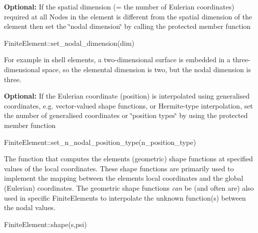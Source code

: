 \begin{DoxyItemize}
\begin{DoxyItemize}
\item {\bfseries Optional\+:} If the spatial dimension (= the number of Eulerian coordinates) required at all Nodes in the element is different from the spatial dimension of the element then set the \char`\"{}nodal dimension\char`\"{} by calling the protected member function
\begin{DoxyCode}
FiniteElement::set\_nodal\_dimension(dim)
\end{DoxyCode}
 For example in shell elements, a two-\/dimensional surface is embedded in a three-\/dimensional space, so the elemental dimension is two, but the nodal dimension is three.
\item {\bfseries Optional\+:} If the Eulerian coordinate (position) is interpolated using generalised coordinates, e.\+g. vector-\/valued shape functions, or Hermite-\/type interpolation, set the number of generalised coordinates or \char`\"{}position types\char`\"{} by using the protected member function 
\begin{DoxyCode}
FiniteElement::set\_n\_nodal\_position\_type(n\_position\_type)
\end{DoxyCode}

\end{DoxyItemize}
\item The function that computes the element\textquotesingle{}s (geometric) shape functions at specified values of the local coordinates. These shape functions are primarily used to implement the mapping between the element\textquotesingle{}s local coordinates and the global (Eulerian) coordinates. The geometric shape functions {\itshape can} be (and often are) also used in specific {\ttfamily Finite\+Elements} to interpolate the unknown function(s) between the nodal values. 
\begin{DoxyCode}
FiniteElement::shape(s,psi) 
\end{DoxyCode}

\end{DoxyItemize}

